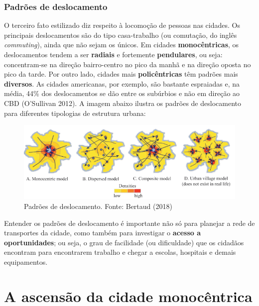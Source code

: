 \documentclass[
  12pt,
  a4paper,
]{article}
\begin{document}
\hypertarget{padruxf5es-de-deslocamento}{%
\subsubsection{Padrões de
deslocamento}\label{padruxf5es-de-deslocamento}}

O terceiro fato estilizado diz respeito à locomoção de pessoas nas
cidades. Os principais deslocamentos são do tipo casa-trabalho (ou
comutação, do inglês \emph{commuting}), ainda que não sejam os únicos.
Em cidades \textbf{monocêntricas}, os deslocamentos tendem a ser
\textbf{radiais} e fortemente \textbf{pendulares}, ou seja:
concentram-se na direção bairro-centro no pico da manhã e na direção
oposta no pico da tarde. Por outro lado, cidades mais
\textbf{policêntricas} têm padrões mais \textbf{diversos}. As cidades
americanas, por exemplo, são bastante espraiadas e, na média, 44\% dos
deslocamentos se dão entre os subúrbios e não em direção ao CBD
(O'Sullivan 2012). A imagem abaixo ilustra os padrões de deslocamento
para diferentes tipologias de estrutura urbana:

\begin{figure}

{\centering \includegraphics[width=0.8\linewidth]{src/images/bertaud_commuting} 

}

\caption{\label{fig:commuting} Padrões de deslocamento. Fonte: Bertaud (2018)}\label{fig:commuting}
\end{figure}

Entender os padrões de deslocamento é importante não só para planejar a
rede de transportes da cidade, como também para investigar o
\textbf{acesso a oportunidades}; ou seja, o grau de facilidade (ou
dificuldade) que os cidadãos encontram para encontrarem trabalho e
chegar a escolas, hospitais e demais equipamentos.

\hypertarget{a-ascensuxe3o-da-cidade-monocuxeantrica}{%
\section{A ascensão da cidade
monocêntrica}\label{a-ascensuxe3o-da-cidade-monocuxeantrica}}
\end{document}
